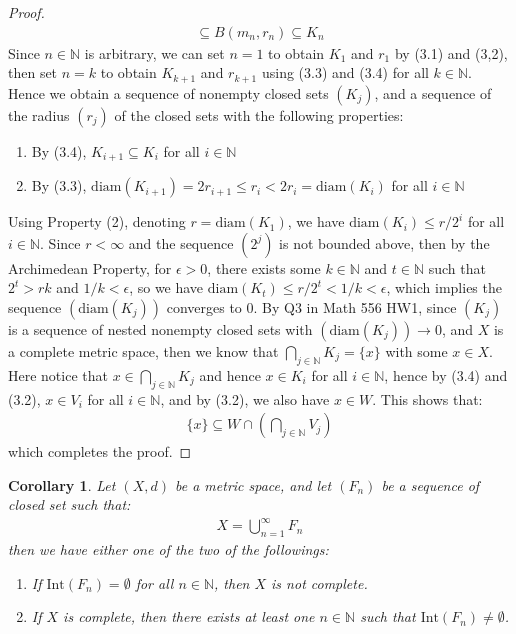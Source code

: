 \documentclass[11pt]{book}
\theoremstyle{break}
\theoremstyle{break}
\newtheorem{corT}[lem]{Corollary}
\newcommand{\N}{\mathbb{N}}
\newcommand{\Int}{\text{Int}}
\begin{document}
\begin{proof}
\begin{align}
\subseteq B(m_n,r_n) \subseteq K_n 
\end{align}
Since $n\in \N$ is arbitrary, we can set $n=1$ to obtain $K_1$ and $r_1$ by (3.1) and (3,2), then set $n=k$ to obtain $K_{k+1}$ and $r_{k+1}$ using (3.3) and (3.4) for all $k \in \N$. Hence we obtain a sequence of nonempty closed sets $(K_j)$, and a sequence of the radius $(r_j)$ of the closed sets with the following properties:
\begin{enumerate}[topsep=3pt,itemsep=-1ex,partopsep=1ex,parsep=1ex]
\item By (3.4), $K_{i+1}\subseteq K_i$ for all $i \in \N$
\item By (3.3), $\text{diam}(K_{i+1}) = 2r_{i+1} \leq r_{i}<2r_{i} = \text{diam}(K_i)$ for all $i \in \N$
\end{enumerate}
Using Property (2), denoting $r = \text{diam}(K_1)$, we have $\text{diam}(K_i) \leq r/2^i$ for all $i \in \N$. Since $r<\infty$ and the sequence $(2^j)$ is not bounded above, then by the Archimedean Property, for $\epsilon>0$, there exists some $k \in \N$ and $t \in \N$ such that $2^t > rk $ and $1/k < \epsilon$, so we have $\text{diam}(K_t) \leq  r/2^t < 1/k < \epsilon$, which implies the sequence $(\text{diam}(K_j))$ converges to $0$. By Q3 in Math 556 HW1, since $(K_j)$ is a sequence of nested nonempty closed sets with $(\text{diam}(K_j)) \to 0$, and $X$ is a complete metric space, then we know that $\bigcap_{j \in \N}K_j = \{x\}$ with some $x \in X$. Here notice that $x \in \bigcap_{j \in \N} K_j$ and hence $x \in K_i$ for all $i \in \N$, hence by (3.4) and (3.2), $x \in V_{i}$ for all $i \in \N$, and by (3.2), we also have $x \in W$. This shows that:
\begin{align*}
\{x\} \subseteq W\cap \left(\bigcap_{j\in \N} V_j\right)
\end{align*} 
which completes the proof.
\end{proof}

\begin{corT}
Let $(X,d)$ be a metric space, and let $(F_n)$ be a sequence of closed set such that: 
\begin{align*}
X = \bigcup_{n=1}^\infty F_n
\end{align*} 
then we have either one of the two of the followings:
\begin{enumerate}[topsep=3pt,itemsep=-1ex,partopsep=1ex,parsep=1ex]
\item If $\Int(F_n) = \emptyset$ for all $n \in \N$, then $X$ is not complete.
\item If $X$ is complete, then there exists at least one $n \in \N$ such that $\Int(F_n) \neq \emptyset$. 
\end{enumerate}
\end{corT}
\end{document}
